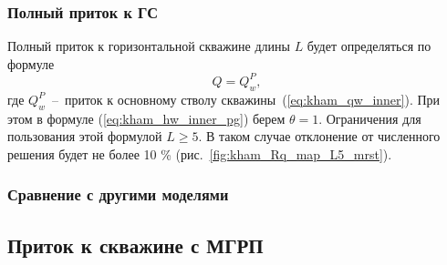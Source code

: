 \documentclass{article}
\begin{document}
\subsubsection{Полный приток к ГС}
Полный приток к горизонтальной скважине длины $L$ будет определяться по формуле
\begin{equation}
\displaystyle
Q = Q_w^P,
\label{eq:kham_hw_total}
\end{equation}
где $Q_w^P$~--~приток к основному стволу скважины~(\ref{eq:kham_qw_inner}).
При этом в формуле (\ref{eq:kham_hw_inner_pg}) берем $\theta=1$. Ограничения для пользования этой формулой $L \geq 5$. В таком случае отклонение от численного решения будет не более 10 \% (рис.~\ref{fig:kham_Rq_map_L5_mrst}).

\subsubsection{Сравнение с другими моделями}

\subsection{Приток к скважине с МГРП}



\end{document}
